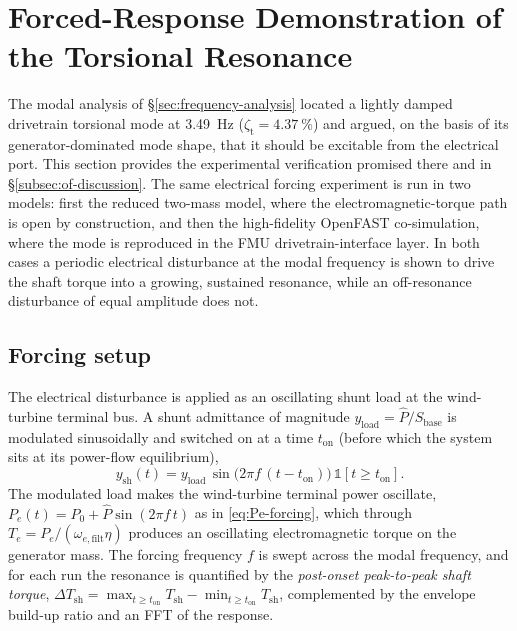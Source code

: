 
\section{Forced-Response Demonstration of the Torsional Resonance}
\label{sec:forcedresponse}

The modal analysis of \S\ref{sec:frequency-analysis} located a lightly damped
drivetrain torsional mode at \SI{3.49}{\hertz} ($\zeta_{\mathrm{t}} =
\SI{4.37}{\percent}$) and argued, on the basis of its generator-dominated mode
shape, that it should be excitable from the electrical port. This section
provides the experimental verification promised there and in
\S\ref{subsec:of-discussion}. The same electrical forcing experiment is run in
two models: first the reduced two-mass model, where the electromagnetic-torque
path is open by construction, and then the high-fidelity OpenFAST co-simulation,
where the mode is reproduced in the FMU drivetrain-interface layer. In both
cases a periodic electrical disturbance at the modal frequency is shown to drive
the shaft torque into a growing, sustained resonance, while an off-resonance
disturbance of equal amplitude does not.

\subsection{Forcing setup}
\label{subsec:fr-setup}

The electrical disturbance is applied as an oscillating shunt load at the
wind-turbine terminal bus. A shunt admittance of magnitude $y_{\mathrm{load}} =
\hat{P}/S_{\mathrm{base}}$ is modulated sinusoidally and switched on at a time
$t_{\mathrm{on}}$ (before which the system sits at its power-flow equilibrium),
\begin{equation}
  y_{\mathrm{sh}}(t) = y_{\mathrm{load}}\,
  \sin\!\big(2\pi f\,(t-t_{\mathrm{on}})\big)\,\mathbb{1}[t \ge t_{\mathrm{on}}].
  \label{eq:fr-forcing}
\end{equation}
The modulated load makes the wind-turbine terminal power oscillate,
$P_e(t) = P_0 + \hat{P}\sin(2\pi f\,t)$ as in \eqref{eq:Pe-forcing}, which
through $T_e = P_e/(\omega_{e,\mathrm{filt}}\eta)$ produces an oscillating
electromagnetic torque on the generator mass. The forcing frequency $f$ is swept
across the modal frequency, and for each run the resonance is quantified by the
\emph{post-onset peak-to-peak shaft torque}, $\Delta T_{\mathrm{sh}} =
\max_{t\ge t_{\mathrm{on}}} T_{\mathrm{sh}} - \min_{t\ge t_{\mathrm{on}}}
T_{\mathrm{sh}}$, complemented by the envelope build-up ratio and an FFT of the
response.

